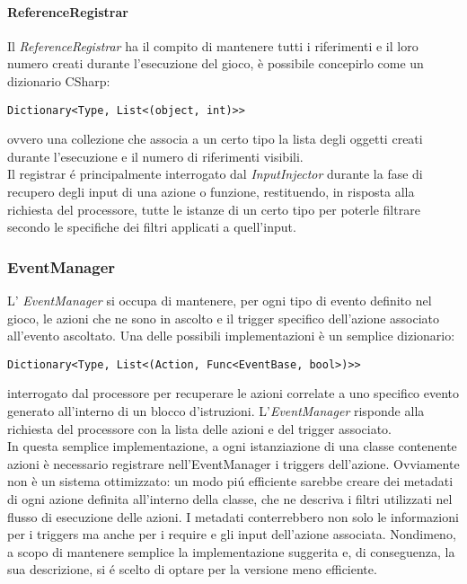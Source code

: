 \paragraph{ReferenceRegistrar}
Il \textit{ReferenceRegistrar} ha il compito di mantenere tutti i riferimenti e il loro numero
creati durante l'esecuzione del gioco, è possibile concepirlo come un dizionario CSharp:
\begin{lstlisting}[style=sharpc_small]
Dictionary<Type, List<(object, int)>>    
\end{lstlisting}
ovvero una collezione che associa a un certo tipo la lista degli oggetti creati durante l'esecuzione 
e il numero di riferimenti visibili. \\
Il registrar é principalmente interrogato dal \textit{InputInjector} durante la fase di recupero degli input
di una azione o funzione, restituendo, in risposta alla richiesta del processore, tutte le istanze di un certo tipo 
per poterle filtrare secondo le specifiche dei filtri applicati a quell'input.

\subsubsection{EventManager}
L' \textit{EventManager} si occupa di mantenere, per ogni tipo di evento definito nel gioco, 
le azioni che ne sono in ascolto e il trigger specifico dell'azione associato all'evento ascoltato. 
Una delle possibili implementazioni è un semplice dizionario:
\begin{lstlisting}[style=sharpc_small]
Dictionary<Type, List<(Action, Func<EventBase, bool>)>>
\end{lstlisting}
interrogato dal processore per recuperare le azioni correlate a uno specifico evento generato all'interno di un blocco d'istruzioni.
L'\textit{EventManager} risponde alla richiesta del processore con la lista delle azioni e del trigger associato. \\ 
In questa semplice implementazione, a ogni istanziazione di una classe contenente azioni è necessario registrare nell'EventManager
i triggers dell'azione. Ovviamente non è un sistema ottimizzato: un modo piú efficiente sarebbe creare dei metadati di ogni azione definita 
all'interno della classe, che ne descriva i filtri utilizzati nel flusso di esecuzione delle azioni.
I metadati conterrebbero non solo le informazioni per i triggers ma anche per i require e gli input dell'azione associata.
Nondimeno, a scopo di mantenere semplice la implementazione suggerita e, di conseguenza, la sua descrizione, 
si é scelto di optare per la versione meno efficiente.

